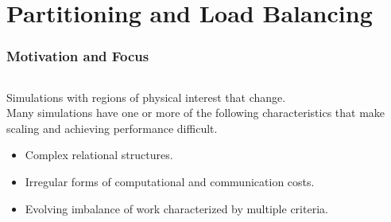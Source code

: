 \documentclass[aspectratio=169]{beamer}
\begin{document}
\section{Partitioning and Load Balancing}
\begin{frame}
  \frametitle{Motivation and Focus}
  \begin{columns}
    \begin{column}{0.7\textwidth}
      Simulations with regions of physical interest that change.\\
      \smallskip
      Many simulations have one or more of the following
      characteristics that make scaling and achieving
      performance difficult.
      \begin{itemize}
        \item Complex relational structures.
        \item Irregular forms of computational and communication costs.
        \item Evolving imbalance of work characterized by multiple criteria.
      \end{itemize}


\end{column}
\end{columns}
\end{frame}
\end{document}
